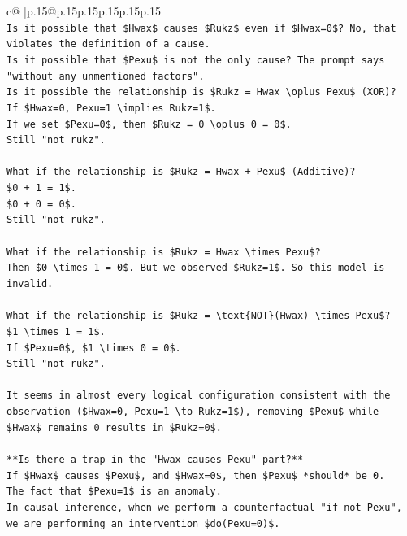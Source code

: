 \documentclass{article}
\begin{document}
{\begin{supertabular}{c@{$\;$}|p{.15\linewidth}@{}p{.15\linewidth}p{.15\linewidth}p{.15\linewidth}p{.15\linewidth}p{.15\linewidth}}
{{{\\ 
\texttt{Is it possible that \$Hwax\$ causes \$Rukz\$ even if \$Hwax=0\$? No, that violates the definition of a cause.} \\
\texttt{Is it possible that \$Pexu\$ is not the only cause? The prompt says "without any unmentioned factors".} \\
\texttt{Is it possible the relationship is \$Rukz = Hwax \textbackslash{}oplus Pexu\$ (XOR)?} \\
\texttt{If \$Hwax=0, Pexu=1 \textbackslash{}implies Rukz=1\$.} \\
\texttt{If we set \$Pexu=0\$, then \$Rukz = 0 \textbackslash{}oplus 0 = 0\$.} \\
\texttt{Still "not rukz".} \\
\\ 
\texttt{What if the relationship is \$Rukz = Hwax + Pexu\$ (Additive)?} \\
\texttt{\$0 + 1 = 1\$.} \\
\texttt{\$0 + 0 = 0\$.} \\
\texttt{Still "not rukz".} \\
\\ 
\texttt{What if the relationship is \$Rukz = Hwax \textbackslash{}times Pexu\$?} \\
\texttt{Then \$0 \textbackslash{}times 1 = 0\$. But we observed \$Rukz=1\$. So this model is invalid.} \\
\\ 
\texttt{What if the relationship is \$Rukz = \textbackslash{}text\{NOT\}(Hwax) \textbackslash{}times Pexu\$?} \\
\texttt{\$1 \textbackslash{}times 1 = 1\$.} \\
\texttt{If \$Pexu=0\$, \$1 \textbackslash{}times 0 = 0\$.} \\
\texttt{Still "not rukz".} \\
\\ 
\texttt{It seems in almost every logical configuration consistent with the observation (\$Hwax=0, Pexu=1 \textbackslash{}to Rukz=1\$), removing \$Pexu\$ while \$Hwax\$ remains 0 results in \$Rukz=0\$.} \\
\\ 
\texttt{**Is there a trap in the "Hwax causes Pexu" part?**} \\
\texttt{If \$Hwax\$ causes \$Pexu\$, and \$Hwax=0\$, then \$Pexu\$ *should* be 0.} \\
\texttt{The fact that \$Pexu=1\$ is an anomaly.} \\
\texttt{In causal inference, when we perform a counterfactual "if not Pexu", we are performing an intervention \$do(Pexu=0)\$.} \\
}}}
\end{supertabular}}
\end{document}
